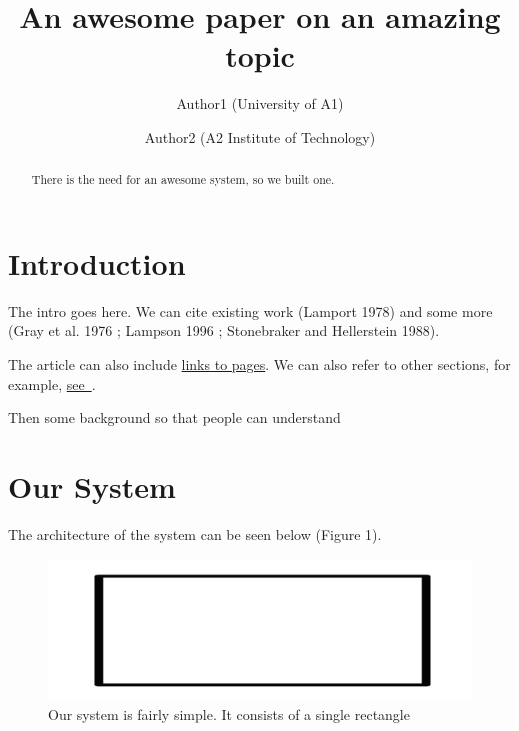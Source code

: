 \documentclass[]{article}
\title{An awesome paper on an amazing topic}
\author{
                    Author1  (University of A1) 
                       \and
                    Author2  (A2 Institute of Technology) 
                      }
\date{}
\begin{document}

\maketitle


\begin{abstract}
There is the need for an awesome system, so we built one.
\end{abstract}








\section{Introduction}\label{introduction}

The intro goes here. We can cite existing work (Lamport 1978) and some
more (Gray et al. 1976 ; Lampson 1996 ; Stonebraker and Hellerstein
1988).

The article can also include \href{http://wikipedia.org}{links to
pages}. We can also refer to other sections, for example,
\hyperref[bg]{see~}.


Then some background so that people can understand

\section{Our System}\label{our-system}

The architecture of the system can be seen below (Figure 1).

\begin{figure}[htbp]
\centering
\includegraphics{figures/square.png}
\caption{Our system is fairly simple. It consists of a single rectangle}
\end{figure}
\end{document}
